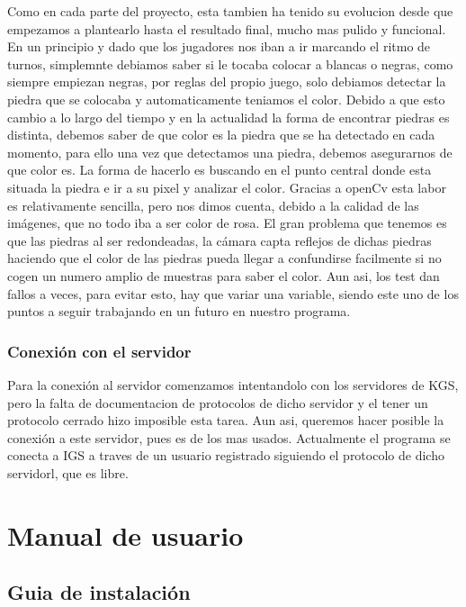\documentclass[12pt,a4paper]{report}
\begin{document}
Como en cada parte del proyecto, esta tambien ha tenido su evolucion desde que
empezamos a plantearlo hasta el resultado final, mucho mas pulido y funcional.
En un principio y dado que los jugadores nos iban a ir marcando el ritmo de
turnos, simplemnte debiamos saber si le tocaba colocar a blancas o negras, como
siempre empiezan negras, por reglas del propio juego, solo debiamos detectar la
piedra que se colocaba y automaticamente teniamos el color.  Debido a que esto
cambio a lo largo del tiempo y en la actualidad la forma de encontrar piedras es
distinta, debemos saber de que color es la piedra que se ha detectado en cada
momento, para ello una vez que detectamos una piedra, debemos asegurarnos de que
color es. La forma de hacerlo es buscando en el punto central donde esta situada
la piedra e ir a su pixel y analizar el color. Gracias a openCv esta labor es
relativamente sencilla, pero nos dimos cuenta, debido a la calidad de las
imágenes, que no todo iba a ser color de rosa. El gran problema que tenemos es
que las piedras al ser redondeadas, la cámara capta reflejos de dichas piedras
haciendo que el color de las piedras pueda llegar a confundirse facilmente si no
cogen un numero amplio de muestras para saber el color. Aun asi, los test dan
fallos a veces, para evitar esto, hay que variar una variable, siendo este uno
de los puntos a seguir trabajando en un futuro en nuestro programa.


\subsection{Conexión con el servidor}

Para la conexión al servidor comenzamos intentandolo con los servidores de KGS,
pero la falta de documentacion de protocolos de dicho servidor y el tener un
protocolo cerrado hizo imposible esta tarea. Aun asi, queremos hacer posible la
conexión a este servidor, pues es de los mas usados. Actualmente el programa se
conecta a IGS a traves de un usuario registrado siguiendo el protocolo de dicho
servidorl, que es libre.


\chapter{Manual de usuario}

\section{Guia de instalación} 
\end{document}
